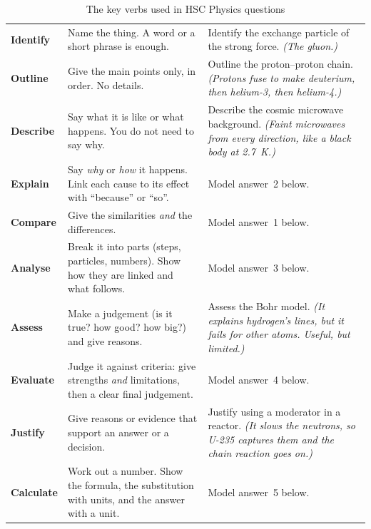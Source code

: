 \begin{table}
  \caption*{The key verbs used in HSC Physics questions}
  \centering
  \small
  \begin{tabular}{@{}L{18mm}L{63mm}L{60mm}@{}}
    \toprule
     &  & \\
    \midrule
    \textbf{Identify} & Name the thing. A word or a short phrase is enough.
      & Identify the exchange particle of the strong force. \emph{(The gluon.)}\\
    \textbf{Outline} & Give the main points only, in order. No details.
      & Outline the proton--proton chain. \emph{(Protons fuse to make deuterium, then
        helium-3, then helium-4.)}\\
    \textbf{Describe} & Say what it is like or what happens. You do not need to say why.
      & Describe the cosmic microwave background. \emph{(Faint microwaves from every
        direction, like a black body at \qty{2.7}{K}.)}\\
    \textbf{Explain} & Say \emph{why} or \emph{how} it happens. Link each cause to its
      effect with ``because'' or ``so''.
      & Model answer~2 below.\\
    \textbf{Compare} & Give the similarities \emph{and} the differences.
      & Model answer~1 below.\\
    \textbf{Analyse} & Break it into parts (steps, particles, numbers). Show how they
      are linked and what follows.
      & Model answer~3 below.\\
    \textbf{Assess} & Make a judgement (is it true? how good? how big?) and give reasons.
      & Assess the Bohr model. \emph{(It explains hydrogen's lines, but it fails for
        other atoms. Useful, but limited.)}\\
    \textbf{Evaluate} & Judge it against criteria: give strengths \emph{and} limitations,
      then a clear final judgement.
      & Model answer~4 below.\\
    \textbf{Justify} & Give reasons or evidence that support an answer or a decision.
      & Justify using a moderator in a reactor. \emph{(It slows the neutrons, so U-235
        captures them and the chain reaction goes on.)}\\
    \textbf{Calculate} & Work out a number. Show the formula, the substitution with units,
      and the answer with a unit.
      & Model answer~5 below.\\
    \bottomrule
  \end{tabular}
\end{table}

